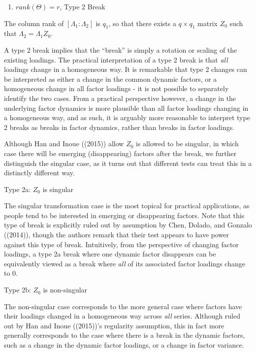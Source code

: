 \documentclass[
]{article}
\providecommand{\tightlist}{%
  \setlength{\itemsep}{0pt}\setlength{\parskip}{0pt}}
\begin{document}
\begin{enumerate}
\def\labelenumi{\arabic{enumi}.}
\setcounter{enumi}{1}
\tightlist
\item
  \(rank(\Theta) = r\), Type 2 Break
\end{enumerate}

The column rank of \([\Lambda_1 : \Lambda_2]\) is \(q_1\), so that there
exists a \(q \times q_1\) matrix \(Z_0\) such that
\(\Lambda_2 = \Lambda_1 Z_0\).

A type 2 break implies that the ``break'' is simply a rotation or
scaling of the existing loadings. The practical interpretation of a type
2 break is that \emph{all} loadings change in a homogeneous way. It is
remarkable that type 2 changes can be interpreted as either a change in
the common dynamic factors, or a homogeneous change in all factor
loadings - it is not possible to separately identify the two cases. From
a practical perspective however, a change in the underlying factor
dynamics is more plausible than all factor loadings changing in a
homogeneous way, and as such, it is arguably more reasonable to
interpret type 2 breaks as breaks in factor dynamics, rather than breaks
in factor loadings.

Although Han and Inoue ((2015)) allow \(Z_0\) is allowed to be singular,
in which case there will be emerging (disappearing) factors after the
break, we further distinguish the singular case, as it turns out that
different tests can treat this in a distinctly different way.

Type 2a: \(Z_0\) is singular

The singular transformation case is the most topical for practical
applications, as people tend to be interested in emerging or
disappearing factors. Note that this type of break is explicitly ruled
out by assumption by Chen, Dolado, and Gonzalo ((2014)), though the
authors remark that their test appears to have power against this type
of break. Intuitively, from the perspective of changing factor loadings,
a type 2a break where one dynamic factor disappears can be equivalently
viewed as a break where \emph{all} of its associated factor loadings
change to 0.

Type 2b: \(Z_0\) is non-singular

The non-singular case corresponds to the more general case where factors
have their loadings changed in a homogeneous way across \emph{all}
series. Although ruled out by Han and Inoue ((2015))'s regularity
assumption, this in fact more generally corresponds to the case where
there is a break in the dynamic factors, such as a change in the dynamic
factor loadings, or a change in factor variance.
\end{document}
